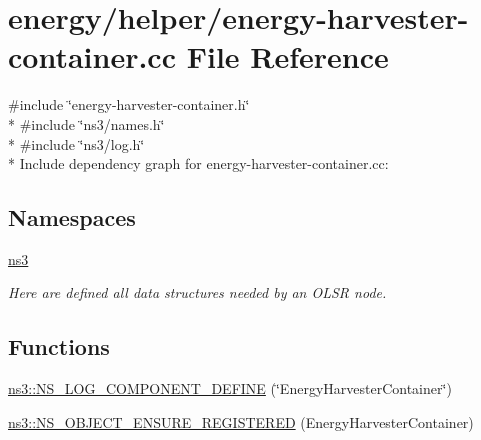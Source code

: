 \hypertarget{energy-harvester-container_8cc}{}\section{energy/helper/energy-\/harvester-\/container.cc File Reference}
\label{energy-harvester-container_8cc}
{\ttfamily \#include \char`\"{}energy-\/harvester-\/container.\+h\char`\"{}}\\*
{\ttfamily \#include \char`\"{}ns3/names.\+h\char`\"{}}\\*
{\ttfamily \#include \char`\"{}ns3/log.\+h\char`\"{}}\\*
Include dependency graph for energy-\/harvester-\/container.cc\+:
\subsection*{Namespaces}
\begin{DoxyCompactItemize}
\item 
 \hyperlink{namespacens3}{ns3}
\begin{DoxyCompactList}\small\item\em Here are defined all data structures needed by an O\+L\+SR node. \end{DoxyCompactList}\end{DoxyCompactItemize}
\subsection*{Functions}
\begin{DoxyCompactItemize}
\item 
\hyperlink{namespacens3_a039735d600e5acdd8fc17cc223ee0507}{ns3\+::\+N\+S\+\_\+\+L\+O\+G\+\_\+\+C\+O\+M\+P\+O\+N\+E\+N\+T\+\_\+\+D\+E\+F\+I\+NE} (\char`\"{}Energy\+Harvester\+Container\char`\"{})
\item 
\hyperlink{namespacens3_add4f30cf4f1eed418bbb01bc88ff0d46}{ns3\+::\+N\+S\+\_\+\+O\+B\+J\+E\+C\+T\+\_\+\+E\+N\+S\+U\+R\+E\+\_\+\+R\+E\+G\+I\+S\+T\+E\+R\+ED} (Energy\+Harvester\+Container)
\end{DoxyCompactItemize}

